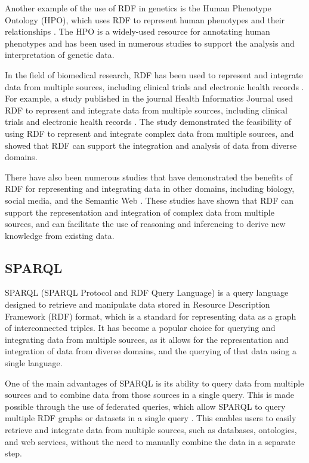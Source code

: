Another example of the use of RDF in genetics is the Human Phenotype Ontology (HPO), which uses RDF to represent human phenotypes and their relationships \citep{robinson2010human}.  The HPO is a widely-used resource for annotating human phenotypes and has been used in numerous studies to support the analysis and interpretation of genetic data.

In the field of biomedical research, RDF has been used to represent and integrate data from multiple sources, including clinical trials and electronic health records \citep{luz2015providing}.  For example, a study published in the journal Health Informatics Journal used RDF to represent and integrate data from multiple sources, including clinical trials and electronic health records \citep{luz2015providing}.  The study demonstrated the feasibility of using RDF to represent and integrate complex data from multiple sources, and showed that RDF can support the integration and analysis of data from diverse domains.

There have also been numerous studies that have demonstrated the benefits of RDF for representing and integrating data in other domains, including biology, social media, and the Semantic Web \citep{schreiber2014rdf,allemang2011semantic,heath2011linked}.  These studies have shown that RDF can support the representation and integration of complex data from multiple sources, and can facilitate the use of reasoning and inferencing to derive new knowledge from existing data.

\subsection{SPARQL}

SPARQL (SPARQL Protocol and RDF Query Language) is a query language designed to retrieve and manipulate data stored in Resource Description Framework (RDF) format, which is a standard for representing data as a graph of interconnected triples\citep{prud2008sparql}.  It has become a popular choice for querying and integrating data from multiple sources, as it allows for the representation and integration of data from diverse domains, and the querying of that data using a single language.

One of the main advantages of SPARQL is its ability to query data from multiple sources and to combine data from those sources in a single query.  This is made possible through the use of federated queries, which allow SPARQL to query multiple RDF graphs or datasets in a single query \citep{allemang2011semantic,rakhmawati2013querying}.  This enables users to easily retrieve and integrate data from multiple sources, such as databases, ontologies, and web services, without the need to manually combine the data in a separate step.


